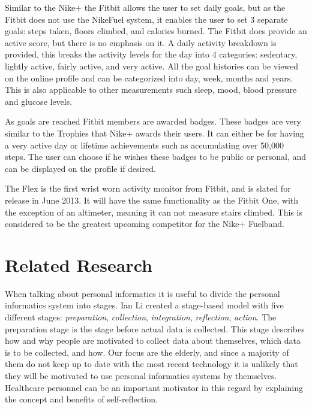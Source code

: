 Similar to the Nike+ the Fitbit allows the user to set daily goals, but as the Fitbit does not use the NikeFuel system, it enables the user to set 3 separate goals: steps taken, floors climbed, and calories burned. The Fitbit does provide an active score, but there is no emphasis on it. A daily activity breakdown is provided, this breaks the activity levels for the day into 4 categories: sedentary, lightly active, fairly active, and very active. All the goal histories can be viewed on the online profile and can be categorized into day, week, months and years. This is also applicable to other measurements such sleep, mood, blood pressure and glucose levels. 


As goals are reached Fitbit members are awarded badges. These badges are very similar to the Trophies that Nike+ awards their users. It can either be for having a very active day or lifetime achievements such as accumulating over 50,000 steps. The user can choose if he wishes these badges to be public or personal, and can be displayed on the profile if desired.

The Flex is the first wrist worn activity monitor from Fitbit, and is slated for release in June 2013. It will have the same functionality as the Fitbit One, with the exception of an altimeter, meaning it can not measure stairs climbed. This is considered to be the greatest upcoming competitor for the Nike+ Fuelband.



\section{Related Research}

When talking about personal informatics it is useful to divide the personal informatics system into stages. Ian Li %
created a stage-based model \cite{li2010} with five different stages: \emph{preparation}, \emph{collection}, \emph{integration}, \emph{reflection}, \emph{action}. The preparation stage is the stage before actual data is collected. This stage describes how and why people are motivated to collect data about themselves, which data is to be collected, and how. Our focus are the elderly, and since a majority of them do not keep up to date with the most recent technology it is unlikely that they will be motivated to use personal informatics systems by themselves. %
Healthcare personnel can be an important motivator in this regard by explaining the concept and benefits of self-reflection. %

